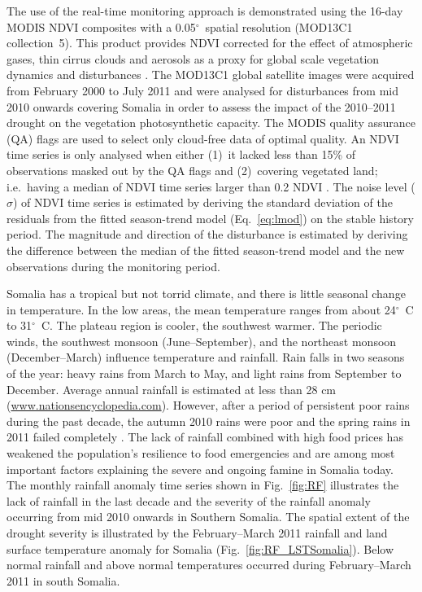 \documentclass[authoryear,preprint,review,10pt]{elsarticle}
\newcommand{\degree}{\ensuremath{^\circ}}
\begin{document}
The use of the real-time monitoring approach is demonstrated using the 16-day MODIS NDVI composites with a 0.05\degree \ spatial resolution (MOD13C1 collection~5). This product provides  NDVI corrected for the effect of atmospheric gases, thin cirrus clouds and aerosols as a proxy for global scale vegetation dynamics and disturbances \citep{Huete2002}.
The MOD13C1 global satellite images were acquired from February 2000 to July 2011 and were analysed for disturbances from mid 2010 onwards covering Somalia
in order to assess the impact of the 2010--2011 drought on the vegetation photosynthetic capacity. The MODIS quality assurance (QA) flags are used to select
only cloud-free data of optimal quality. An NDVI time series is only analysed when either (1)~it lacked less than 15\% of observations masked out by the QA
flags and (2)~covering vegetated land; i.e.\ having a median of NDVI time series larger than 0.2 NDVI \citep{Beurs2009, deJong:wo, Vrieling:2011da}. The
noise level ($\sigma$) of NDVI time series is estimated by deriving the standard deviation of the residuals from the fitted season-trend model
(Eq.~\ref{eq:lmod}) on the stable history period.  The magnitude and direction of the disturbance is estimated by deriving the difference between the median
of the fitted season-trend model and the new observations during the monitoring period.

Somalia has a tropical but not torrid climate, and there is little seasonal change in temperature. In the low areas, the mean temperature ranges from about 24\degree~C to 31\degree~C. The plateau region is cooler, the southwest warmer. The periodic winds, the southwest monsoon (June--September), and the northeast monsoon (December--March) influence temperature and rainfall. Rain falls in two seasons of the year: heavy rains from March to May, and light rains from September to December. Average annual rainfall is estimated at less than 28 cm (\url{www.nationsencyclopedia.com}).  However, after a period of persistent poor rains during the past decade, the autumn 2010 rains were poor and the spring rains in 2011 failed completely \citep{Funk:2011fg}. The lack of rainfall combined with high food prices has weakened the population's resilience to food emergencies and are among most important factors explaining the severe and ongoing famine in Somalia today. The monthly rainfall anomaly time series shown in Fig.~\ref{fig:RF} illustrates the lack of rainfall in the last decade and the severity of the rainfall anomaly occurring from mid 2010 onwards in Southern Somalia. The spatial extent of the drought severity is illustrated by the February--March 2011 rainfall \citep{Xie:1997tw} and land surface temperature anomaly for Somalia (Fig.~\ref{fig:RF_LSTSomalia}). Below normal rainfall and above normal temperatures occurred during February--March 2011 in south Somalia.
\end{document}
